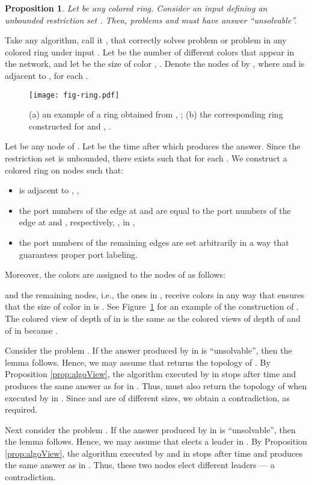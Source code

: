 \documentclass[a4paper,10pt]{article}
\newtheorem{proposition}{Proposition}[section]
\newenvironment{proof}[1][Proof]
{\par\noindent{\bf #1:} }{\hspace*{\fill}\nolinebreak{}\bigskip\par}
\begin{document}
\begin{proposition}
Let  be any colored ring.
Consider an input  defining an unbounded restriction set .
Then, problems  and  must have answer ``unsolvable''.
\end{proposition}
\begin{proof}
Take any algorithm, call it , that correctly solves problem  or problem  in any colored ring under input .
Let  be the number of different colors that appear in the network, and let  be the size of color , .
Denote the nodes of  by , where  and  is adjacent to , for each .
\begin{figure}[htb]
\begin{center}
\texttt{[image: fig-ring.pdf]}
\caption{(a) an example of a ring  obtained from , ; (b) the corresponding ring  constructed for  and , .}
\label{fig:ring}
\end{center}
\end{figure}

Let  be any node of .
Let  be the time after which  produces the answer.
Since the restriction set  is unbounded, there exists  such that  for each .
We construct a colored ring  on  nodes  such that:
\begin{itemize}
 \item  is adjacent to , ,
 \item the port numbers of the edge  at  and  are equal to the port numbers of the edge  at  and , respectively, , in ,
 \item the port numbers of the remaining edges are set arbitrarily in a way that guarantees proper port labeling.
\end{itemize}
Moreover, the colors are assigned to the nodes of  as follows:

and the remaining nodes, i.e., the ones in , receive colors in any way that ensures that the size of color  in  is .
See Figure~\ref{fig:ring} for an example of the construction of .
The colored view of depth  of  in  is the same as the colored views of depth  of  and of  in  because .

Consider the problem .
If the answer produced by  in  is ``unsolvable'', then the lemma follows.
Hence, we may assume that  returns the topology of .
By Proposition \ref{prop:algoView}, the algorithm  executed by  in  stops after time  and produces the same answer as for  in .
Thus,  must also return the topology of  when executed by  in .
Since  and  are of different sizes, we obtain a contradiction, as required.

Next consider the problem .
If the answer produced by  in  is ``unsolvable'', then the lemma follows.
Hence, we may assume that  elects a leader in .
By Proposition \ref{prop:algoView}, the algorithm  executed by  and  in  stops after time  and produces the same answer as in .
Thus, these two nodes elect different leaders --- a contradiction.
\end{proof}
\end{document}
